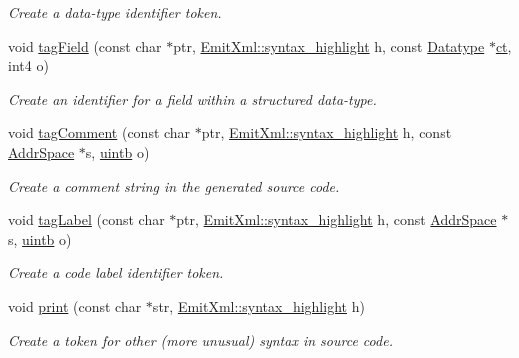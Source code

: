 \begin{DoxyCompactItemize}
\begin{DoxyCompactList}\small\item\em Create a data-\/type identifier token. \end{DoxyCompactList}\item 
void \mbox{\hyperlink{class_token_split_a5185f9c1ceae7c9b9c51f023b56f9287}{tag\+Field}} (const char $\ast$ptr, \mbox{\hyperlink{class_emit_xml_a7c3577436da429c3c75f4b82cac6864f}{Emit\+Xml\+::syntax\+\_\+highlight}} h, const \mbox{\hyperlink{class_datatype}{Datatype}} $\ast$\mbox{\hyperlink{class_token_split_a8966907dba26ba691ffec5cde4676958}{ct}}, int4 o)
\begin{DoxyCompactList}\small\item\em Create an identifier for a field within a structured data-\/type. \end{DoxyCompactList}\item 
void \mbox{\hyperlink{class_token_split_a5f1af6fb8cc5fab53f74701885d0d0f6}{tag\+Comment}} (const char $\ast$ptr, \mbox{\hyperlink{class_emit_xml_a7c3577436da429c3c75f4b82cac6864f}{Emit\+Xml\+::syntax\+\_\+highlight}} h, const \mbox{\hyperlink{class_addr_space}{Addr\+Space}} $\ast$s, \mbox{\hyperlink{types_8h_a2db313c5d32a12b01d26ac9b3bca178f}{uintb}} o)
\begin{DoxyCompactList}\small\item\em Create a comment string in the generated source code. \end{DoxyCompactList}\item 
void \mbox{\hyperlink{class_token_split_a64a5177d3cc95301fc5008b8d5ff0c0e}{tag\+Label}} (const char $\ast$ptr, \mbox{\hyperlink{class_emit_xml_a7c3577436da429c3c75f4b82cac6864f}{Emit\+Xml\+::syntax\+\_\+highlight}} h, const \mbox{\hyperlink{class_addr_space}{Addr\+Space}} $\ast$s, \mbox{\hyperlink{types_8h_a2db313c5d32a12b01d26ac9b3bca178f}{uintb}} o)
\begin{DoxyCompactList}\small\item\em Create a code label identifier token. \end{DoxyCompactList}\item 
void \mbox{\hyperlink{class_token_split_a7418693a38259f2b48837c7bb9b147a4}{print}} (const char $\ast$str, \mbox{\hyperlink{class_emit_xml_a7c3577436da429c3c75f4b82cac6864f}{Emit\+Xml\+::syntax\+\_\+highlight}} h)
\begin{DoxyCompactList}\small\item\em Create a token for other (more unusual) syntax in source code. \end{DoxyCompactList}\item 

\end{DoxyCompactItemize}
